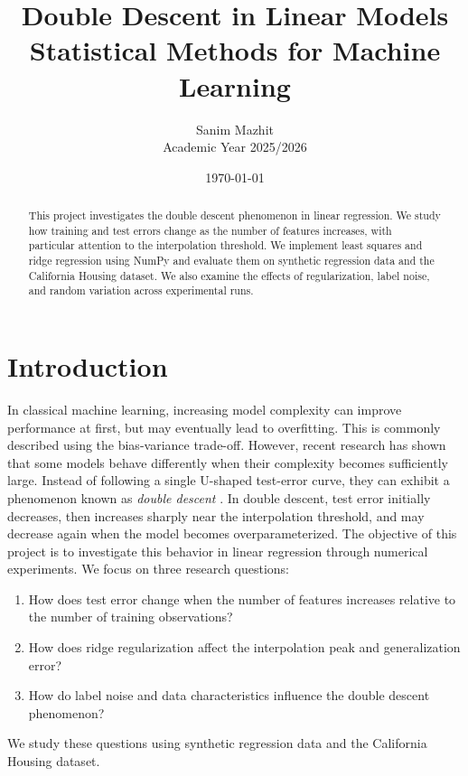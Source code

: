\documentclass[11pt,a4paper]{article}
\title{\textbf{Double Descent in Linear Models}\\[0.5cm]
\large Statistical Methods for Machine Learning}
\author{Sanim Mazhit\\ Academic Year 2025/2026}
\date{\today}
\begin{document}
\maketitle

\begin{abstract}
This project investigates the double descent phenomenon in
linear regression. We study how training and test errors
change as the number of features increases, with particular
attention to the interpolation threshold.
We implement least squares and ridge regression using
NumPy and evaluate them on synthetic regression data and
the California Housing dataset. We also examine the
effects of regularization, label noise, and random variation
across experimental runs.
\end{abstract}

\tableofcontents
\newpage

\section{Introduction}
In classical machine learning, increasing model complexity
can improve performance at first, but may eventually lead
to overfitting. This is commonly described using the
bias-variance trade-off.
However, recent research has shown that some models behave
differently when their complexity becomes sufficiently
large. Instead of following a single U-shaped test-error
curve, they can exhibit a phenomenon known as
\textit{double descent} \cite{belkin2019}.
In double descent, test error initially decreases,
then increases sharply near the interpolation threshold,
and may decrease again when the model becomes
overparameterized.
The objective of this project is to investigate this
behavior in linear regression through numerical experiments.
We focus on three research questions:
\begin{enumerate}
    \item How does test error change when the number of
    features increases relative to the number of
    training observations?
    \item How does ridge regularization affect the
    interpolation peak and generalization error?
    \item How do label noise and data characteristics
    influence the double descent phenomenon?
\end{enumerate}

We study these questions using synthetic regression data
and the California Housing dataset.
\end{document}
